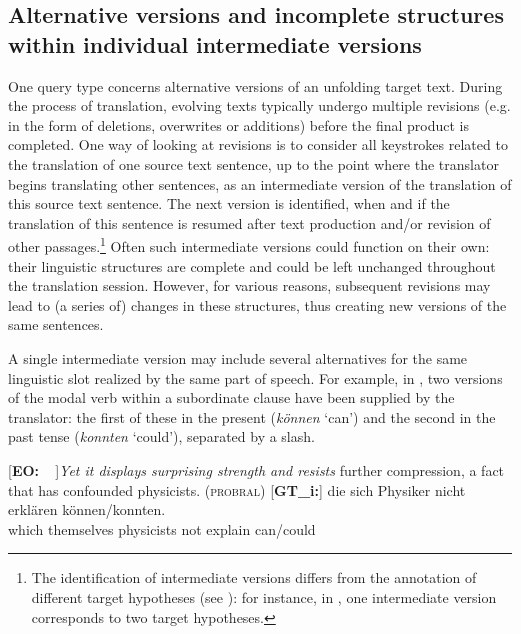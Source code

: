 \documentclass[output=paper]{LSP/langsci}
\begin{document}
\subsection{Alternative versions and incomplete structures within individual intermediate versions} \label{sec:1:3:1}
One query type concerns alternative versions of an unfolding target text. During the process of translation, evolving texts typically undergo multiple revisions (e.g. in the form of deletions, overwrites or additions) before the final product is completed. One way of looking at revisions is to consider all keystrokes related to the translation of one source text sentence, up to the point where the translator begins translating other sentences, as an intermediate version of the translation of this source text sentence. The next version is identified, when and if the translation of this sentence is resumed after text production and/or revision of other passages.\footnote{The identification of intermediate versions differs from the annotation of different target hypotheses (see ): for instance, in , one intermediate version corresponds to two target hypotheses.} Often such intermediate versions could function on their own: their linguistic structures are complete and could be left unchanged throughout the translation session. However, for various reasons, subsequent revisions may lead to (a series of) changes in these structures, thus creating new versions of the same sentences.

A single intermediate version may include several alternatives for the same linguistic slot realized by the same part of speech. For example, in , two versions of the modal verb within a subordinate clause have been supplied by the translator: the first of these in the present (\textit{können} `can') and the second in the past tense (\textit{konnten} `could'), separated by a slash.


\ea \label{ex:1:4}
\begin{xlist}
\exi{}[\textbf{EO:~~}]{\emph{Yet it displays surprising strength and resists} further compression, a fact that has confounded physicists. (\textsc{probral})}
\exi{}[\textbf{GT\_i:}]{
\gll  [{\dots}] die\raute{} sich\raute{} Physiker\raute{} nicht\raute{} erklären\raute{} können\stern{}/konnten.\\
{}  which themselves physicists not explain can/could\\
}
\end{xlist}
\z
\end{document}
